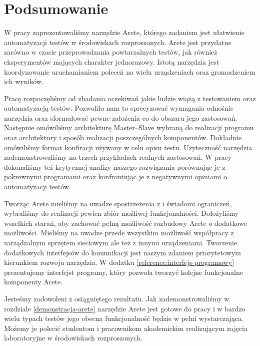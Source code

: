 \documentclass[00-praca-magisterska.tex]{subfiles}
\begin{document}
\chapter*{Podsumowanie}

W pracy zaprezentowaliśmy narzędzie Arete, którego zadaniem jest ułatwienie
automatyzacji testów w środowiskach rozproszonych. Arete jest przydatne zarówno
w czasie przeprowadzania powtarzalnych testów, jak również eksperymentów
mających charakter jednorazowy. Istotą narzędzia jest koordynowanie
uruchamianiem poleceń na wielu urządzeniach oraz gromadzeniem ich wyników.

Pracę rozpoczęliśmy od zbadania oczekiwań jakie ludzie wiążą z testowaniem oraz
automatyzacją testów. Pozwoliło nam to sprecyzować wymagania odnośnie narzędzia
oraz sformułować pewne założenia co do obszaru jego zastosowań.  Następnie
omówiliśmy architekturę Master--Slave wybraną do realizacji programu oraz
architektury i sposób realizacji poszczególnych komponentów. Dokładnie
omówiliśmy format konfiracji używany w celu opisu testu. Użyteczność narzędzia
zademonstrowaliśmy na trzech przykładach realnych zastosowań. W pracy
dokonaliśmy też krytycznej analizy naszego rozwiązania porównując je z
pokrewnymi programami oraz konfrontując je z negatywnymi opiniami o
automatyzacji testów.

Tworząc Arete mieliśmy na uwadze spostrzeżenia z \cite{snake-oil} i
świadomi ograniczeń, wybraliśmy do realizacji pewien zbiór możliwej
funkcjonalności. Dołożyliśmy wszelkich starań, aby zachować pełną możliwość
rozbudowy Arete o dodatkowe możliwości. Mieliśmy na uwadze przede wszystkim
możliwość współpracy z zarządzalnym sprzętem sieciowym ale też z innymi
urządzeniami. Tworzenie dodatkowych interfejsów do komunikacji jest naszym
zdaniem priorytetowym kierunkiem rozwoju narzędzia. W dodatku \ref{reference:interfejs-programowy}
prezentujemy interfejst programy, który pozwola tworzyć kolejne funkcjonalne
komponenty Arete.

Jesteśmy zadowoleni z osiągniętego rezultatu. Jak zademonstrowaliśmy w
rozdziale \ref{demonstracja-arete} narzędzie Arete jest gotowe do pracy i w
bardzo wielu typach testów jego obecna funkcjonalność będzie w pełni
wystarczająca.  Możemy je polecić studentom i pracownikom akademickim
realizującym zajęcia laboratoryjne w środowiskach rozproszonych.
\end{document}
